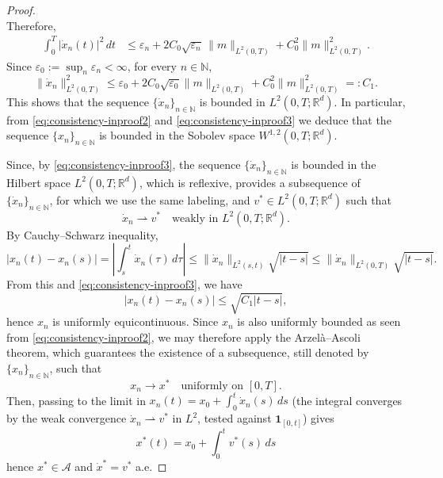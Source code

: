 \documentclass[11pt]{elsarticle}
\theoremstyle{definition}
\theoremstyle{remark}
\numberwithin{equation}{section}
\begin{document}
\begin{proof}
\[		\]
		Therefore,
		\begin{align*}
			\int_0^T |\dot{x}_n(t)|^2 \, dt 
			&\le \varepsilon_n + 2C_0\sqrt{\varepsilon_n} \, \|m\|_{L^2(0,T)} + C_0^2 \|m\|_{L^2(0,T)}^2.
		\end{align*}
		Since $\varepsilon_0 := \sup_n \varepsilon_n < \infty$, for every $n\in\mathbb{N}$,
		\begin{equation}\label{eq:consistency-inproof3}
			\|\dot{x}_n\|^2_{L^2(0,T)} \le \varepsilon_0 + 2 C_0 \sqrt{\varepsilon_0} \|m\|_{L^2(0,T)} +  C^2 _0\|m\|^2_{L^2(0,T)} =: C_1.
		\end{equation}
		This shows that
		the sequence $\{\dot{x}_n\}_{n\in\mathbb{N}}$ is bounded in $L^2(0,T; \mathbb{R}^d)$.
		In particular, from \eqref{eq:consistency-inproof2} and \eqref{eq:consistency-inproof3} we deduce that
		the sequence $\{x_n\}_{n\in\mathbb{N}}$ is bounded in the Sobolev space $W^{1,2}(0,T; \mathbb{R}^d)$.
		
		Since, by \eqref{eq:consistency-inproof3}, the sequence $\{\dot{x}_n\}_{n\in\mathbb{N}}$ is bounded in the Hilbert space $L^2(0,T; \mathbb{R}^d)$, which is reflexive, \cite[Theorem 3.18]{brezis_2011} provides a subsequence  of $\{\dot{x}_n\}_{n\in\mathbb{N}}$, for which we use the same labeling, and $v^*\in L^2(0,T;\mathbb{R}^d)$ such that
		\[
		\dot{x}_n \rightharpoonup v^* \quad \text{weakly in } L^2(0,T; \mathbb{R}^d).
		\]
		By Cauchy--Schwarz inequality,
		\[
		|x_n(t) - x_n(s)| = \left|\int_s^t \dot{x}_n(\tau) \, d\tau\right| 
		\le \|\dot{x}_n\|_{L^2(s,t)} \sqrt{|t - s|} 
		\le \|\dot{x}_n\|_{L^2(0,T)} \sqrt{|t - s|}.
		\]
		From this and \eqref{eq:consistency-inproof3}, we have
		\[
		|x_n(t) - x_n(s)| \le \sqrt{C_1|t - s|},
		\]
		hence $x_n$ is uniformly equicontinuous.
		Since $x_n$ is also uniformly bounded as seen from \eqref{eq:consistency-inproof2},
		we may therefore apply the Arzelà–Ascoli theorem, which guarantees the existence of a subsequence, still denoted by $\{x_n\}_{n\in\mathbb{N}}$, such that
		\[
		x_n \to x^* \quad \text{uniformly on } [0,T].
		\]
		Then, passing to the limit in $x_n(t) = x_0 + \int_0^t \dot{x}_n(s) \, ds$ (the integral converges by the weak convergence $\dot{x}_n \rightharpoonup v^*$ in $L^2$, tested against $\mathbf{1}_{[0,t]}$) gives 
		\[
		x^*(t) = x_0 + \int_0^t v^*(s) \, ds
		\]
		hence $x^* \in \mathcal{A}$ and $\dot{x}^* = v^*$ a.e.
		

\end{proof}
\end{document}

